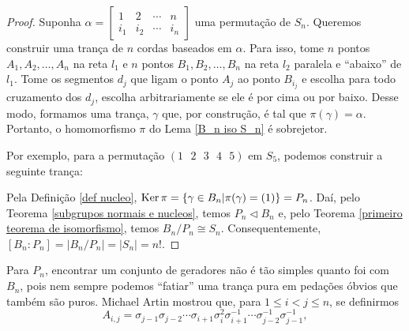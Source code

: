 	\begin{proof}
		Suponha 
		$\alpha = \begin{bmatrix}
		1 & 2 & \cdots & n \\
		i_1 & i_2 & \cdots & i_n
		\end{bmatrix}$ uma permutação de $S_n$. Queremos construir uma trança de $n$ cordas baseados 
		em $\alpha$. Para isso, tome $n$ pontos $A_1, A_2, \dots, A_n$ na reta $l_1$ e $n$ pontos 
		$B_1, B_2, \dots, B_n$ na reta $l_2$ paralela e ``abaixo'' de $l_1$. Tome os segmentos $d_j$ 
		que ligam o ponto $A_j$ ao ponto $B_{i_j}$ e escolha para todo cruzamento dos $d_j$, 
		escolha arbitrariamente se ele é por cima ou por baixo. Desse modo, formamos uma trança, 
		$\gamma$ que, por construção, é tal que $\pi(\gamma) = \alpha$. Portanto, o homomorfismo $\pi$ 
		do Lema \ref{B_n iso S_n} é sobrejetor. 
		
		\par\vspace{0.3cm} Por exemplo, para a permutação $(1\text{ }2\text{ }3\text{ }4\text{ }5)$ 
		em $S_5$, podemos construir a seguinte trança:
		\begin{center}
		\end{center}
		Pela Definição \ref{def nucleo}, $\operatorname{Ker}\pi = \left\{ \gamma\in B_n | \pi(\gamma) = (1) \right\} = P_n$.
		Daí, pelo Teorema \ref{subgrupos normais e nucleos}, temos $P_n\triangleleft B_n$ e, pelo 
		Teorema \ref{primeiro teorema de isomorfismo}, temos $B_n/P_n\cong S_n$. Consequentemente, 
		$[B_n:P_n] = |B_n/P_n| = |S_n| = n!$.
	\end{proof}
	Para $P_n$, encontrar um conjunto de geradores não é tão simples quanto foi com $B_n$, pois nem 
	sempre podemos ``fatiar'' uma trança pura em pedações óbvios que também são puros. Michael Artin 
	mostrou que, para $1\leq i<j\leq n$, se definirmos
	\begin{equation*}
	\tag{Geradores de Artin}
	\label{geradores de Artin}
	    A_{i,j} = 
	    \sigma_{j-1}\sigma_{j-2}
	    \cdots\sigma_{i+1}\sigma_i^2\sigma_{i+1}^{-1}
	    \cdots\sigma_{j-2}^{-1}\sigma_{j-1}^{-1},
	\end{equation*}
